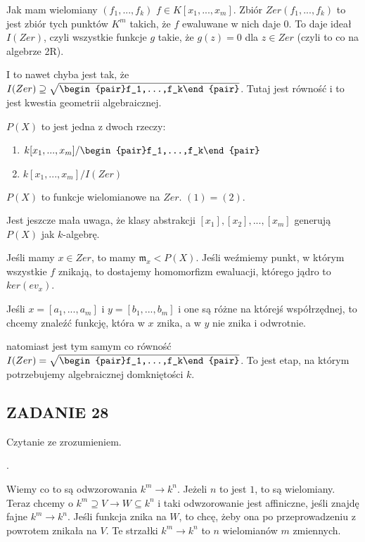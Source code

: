 \documentclass{article}
\begin{document}
Jak mam wielomiany $(f_1,...,f_k)$ $f\in K[x_1,...,x_m]$. Zbiór $Zer(f_1,...,f_k)$ to jest zbiór tych punktów $K^m$ takich, że $f$ ewaluwane w nich daje $0$. To daje ideał $I(Zer)$, czyli wszystkie funkcje $g$ takie, że $g(z)=0$ dla $z\in Zer$ (czyli to co na algebrze 2R).

I to nawet chyba jest tak, że $I(Zer)\supseteq \sqrt{\begin{pair}f_1,...,f_k\end{pair}}$. Tutaj jest równość i to jest kwestia geometrii algebraicznej.

$P(X)$ to jest jedna z dwoch rzeczy:
\begin{enumerate}
    \item $k[x_1,...,x_m]/\begin{pair}f_1,...,f_k\end{pair}$
    \item $k[x_1,...,x_m]/I(Zer)$
\end{enumerate}

$P(X)$ to funkcje wielomianowe na $Zer$. $(1)=(2)$.

Jest jeszcze mała uwaga, że klasy abstrakcji $[x_1],[x_2],...,[x_m]$ generują $P(X)$ jak $k$-algebrę.

 Jeśli mamy $x\in Zer$, to mamy $\mathfrak{m}_x<P(X)$. Jeśli weźmiemy punkt, w którym wszystkie $f$ znikają, to dostajemy homomorfizm ewaluacji, którego jądro to $ker(ev_x)$.

 Jeśli $x=[a_1,...,a_m]$ i $y=[b_1,...,b_m]$ i one są różne na którejś współrzędnej, to chcemy znaleźć funkcję, która w $x$ znika, a w $y$ nie znika i odwrotnie.

 natomiast jest tym samym co równość $I(Zer)=\sqrt{\begin{pair}f_1,...,f_k\end{pair}}$. To jest etap, na którym potrzebujemy algebraicznej domkniętości $k$.

\subsection*{ZADANIE 28}
Czytanie ze zrozumieniem.

.

Wiemy co to są odwzorowania $k^m\to k^n$. Jeżeli $n$ to jest $1$, to są wielomiany.
Teraz chcemy o $k^m\supseteq V\to W\subseteq k^n$ i taki odwzorowanie jest affiniczne, jeśli znajdę fajne $k^m\to k^n$. Jeśli funkcja znika na $W$, to chcę, żeby ona po przeprowadzeniu z powrotem znikała na $V$. Te strzałki $k^m\to k^n$ to $n$ wielomianów $m$ zmiennych.
\end{document}
